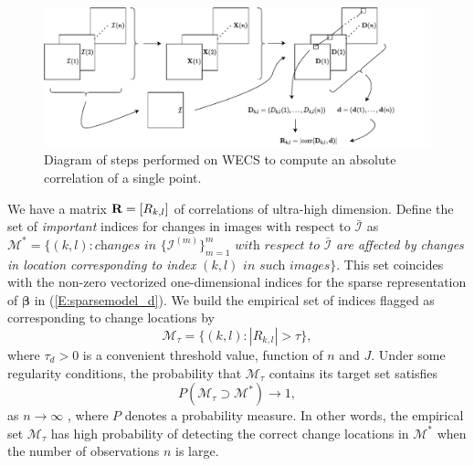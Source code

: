 \documentclass[journal]{IEEEtran}
\newcommand{\vbeta}{\pmb{\beta}}
\newcommand{\vR}{{\textbf R}}
\begin{document}
\begin{figure}[htb!]
\centering
\includegraphics[scale=.45]{../../drawio/diagram_wecs.drawio}
\caption{Diagram of steps performed on WECS to compute an absolute correlation of a single point.}
\label{F:EllipsoidChanges}
\end{figure}


We have a matrix $\vR=[R_{k,l}]$ of correlations of ultra-high dimension. Define the set of 
{\it important} indices for changes in images with respect to $\bar{\mathcal I}$ as 
$\mathcal{M}^{*}=\{(k,l): \textit{changes in } \{\mathcal{I}^{(m)}\}_{m=1}^m \textit{ with respect to}$ $\bar{\mathcal{I}}$ \textit{are affected by changes in location corresponding to index} $(k,l)$ $\textit{in such images}\}$.  This set coincides with the non-zero vectorized one-dimensional indices for the sparse representation of $\vbeta$ in (\ref{E:sparsemodel_d}). 
We build the empirical set of indices flagged as corresponding to change locations by
\begin{equation}
\mathcal{M}_{\tau}=\{(k,l):|R_{k,l}|>\tau\},
\label{E:def_Mtaud}
\end{equation}
where $\tau_d>0$ is a convenient threshold value, function of $n$ and $J$. Under some regularity conditions, the probability that $\mathcal{M}_{\tau}$ contains its target set satisfies
\[
P(\mathcal{M}_{\tau}\supset\mathcal{M}^{*})\rightarrow 1,
\]
as $n\rightarrow\infty$ \cite{fan2020statistical}, where $P$ denotes a probability measure. In other words, the empirical set $\mathcal{M}_{\tau}$ has high probability of detecting the correct change locations in $\mathcal{M}^{*}$ when the number of observations $n$ is large.
\end{document}
